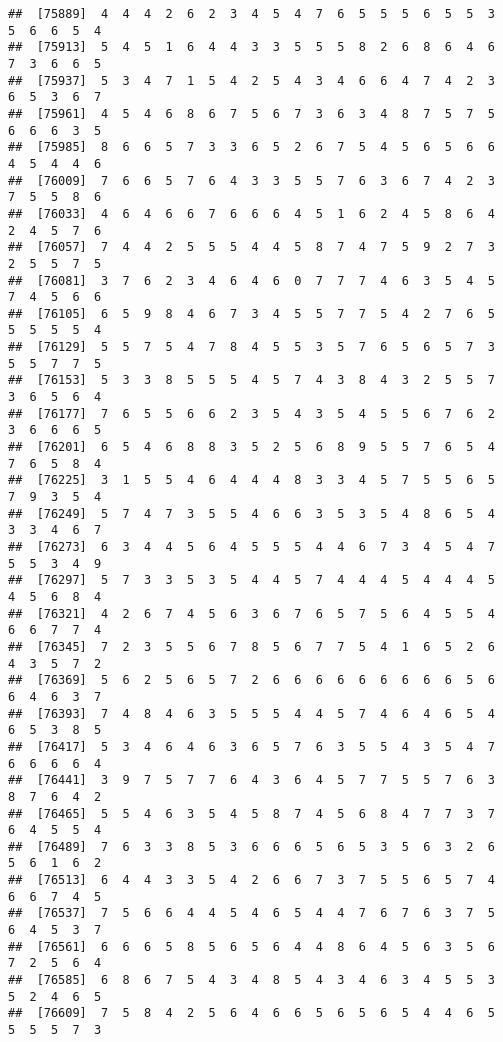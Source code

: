 \documentclass[
]{book}
\begin{document}
\begin{verbatim}
##  [75889]  4  4  4  2  6  2  3  4  5  4  7  6  5  5  5  6  5  5  3  5  6  6  5  4
##  [75913]  5  4  5  1  6  4  4  3  3  5  5  5  8  2  6  8  6  4  6  7  3  6  6  5
##  [75937]  5  3  4  7  1  5  4  2  5  4  3  4  6  6  4  7  4  2  3  6  5  3  6  7
##  [75961]  4  5  4  6  8  6  7  5  6  7  3  6  3  4  8  7  5  7  5  6  6  6  3  5
##  [75985]  8  6  6  5  7  3  3  6  5  2  6  7  5  4  5  6  5  6  6  4  5  4  4  6
##  [76009]  7  6  6  5  7  6  4  3  3  5  5  7  6  3  6  7  4  2  3  7  5  5  8  6
##  [76033]  4  6  4  6  6  7  6  6  6  4  5  1  6  2  4  5  8  6  4  2  4  5  7  6
##  [76057]  7  4  4  2  5  5  5  4  4  5  8  7  4  7  5  9  2  7  3  2  5  5  7  5
##  [76081]  3  7  6  2  3  4  6  4  6  0  7  7  7  4  6  3  5  4  5  7  4  5  6  6
##  [76105]  6  5  9  8  4  6  7  3  4  5  5  7  7  5  4  2  7  6  5  5  5  5  5  4
##  [76129]  5  5  7  5  4  7  8  4  5  5  3  5  7  6  5  6  5  7  3  5  5  7  7  5
##  [76153]  5  3  3  8  5  5  5  4  5  7  4  3  8  4  3  2  5  5  7  3  6  5  6  4
##  [76177]  7  6  5  5  6  6  2  3  5  4  3  5  4  5  5  6  7  6  2  3  6  6  6  5
##  [76201]  6  5  4  6  8  8  3  5  2  5  6  8  9  5  5  7  6  5  4  7  6  5  8  4
##  [76225]  3  1  5  5  4  6  4  4  4  8  3  3  4  5  7  5  5  6  5  7  9  3  5  4
##  [76249]  5  7  4  7  3  5  5  4  6  6  3  5  3  5  4  8  6  5  4  3  3  4  6  7
##  [76273]  6  3  4  4  5  6  4  5  5  5  4  4  6  7  3  4  5  4  7  5  5  3  4  9
##  [76297]  5  7  3  3  5  3  5  4  4  5  7  4  4  4  5  4  4  4  5  4  5  6  8  4
##  [76321]  4  2  6  7  4  5  6  3  6  7  6  5  7  5  6  4  5  5  4  6  6  7  7  4
##  [76345]  7  2  3  5  5  6  7  8  5  6  7  7  5  4  1  6  5  2  6  4  3  5  7  2
##  [76369]  5  6  2  5  6  5  7  2  6  6  6  6  6  6  6  6  6  5  6  6  4  6  3  7
##  [76393]  7  4  8  4  6  3  5  5  5  4  4  5  7  4  6  4  6  5  4  6  5  3  8  5
##  [76417]  5  3  4  6  4  6  3  6  5  7  6  3  5  5  4  3  5  4  7  6  6  6  6  4
##  [76441]  3  9  7  5  7  7  6  4  3  6  4  5  7  7  5  5  7  6  3  8  7  6  4  2
##  [76465]  5  5  4  6  3  5  4  5  8  7  4  5  6  8  4  7  7  3  7  6  4  5  5  4
##  [76489]  7  6  3  3  8  5  3  6  6  6  5  6  5  3  5  6  3  2  6  5  6  1  6  2
##  [76513]  6  4  4  3  3  5  4  2  6  6  7  3  7  5  5  6  5  7  4  6  6  7  4  5
##  [76537]  7  5  6  6  4  4  5  4  6  5  4  4  7  6  7  6  3  7  5  6  4  5  3  7
##  [76561]  6  6  6  5  8  5  6  5  6  4  4  8  6  4  5  6  3  5  6  7  2  5  6  4
##  [76585]  6  8  6  7  5  4  3  4  8  5  4  3  4  6  3  4  5  5  3  5  2  4  6  5
##  [76609]  7  5  8  4  2  5  6  4  6  6  5  6  5  6  5  4  4  6  5  5  5  5  7  3

\end{verbatim}
\end{document}
